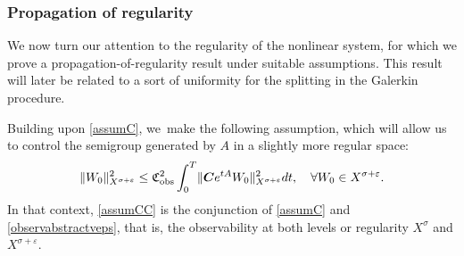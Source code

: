 \documentclass[10pt]{amsart}
\theoremstyle{definition}
\let\veps\varepsilon
\newcommand{\bC}{\boldsymbol{C}}
\providecommand{\norm}[1]{\lVert#1\rVert}
\begin{document}
\subsubsection{Propagation of regularity} We now turn our attention to the regularity of the nonlinear system, for which we prove a propagation-of-regularity result under suitable assumptions. This result will later be related to a sort of uniformity for the splitting in the Galerkin procedure.

Building upon \cref{assumC}, we~make the following assumption, which will allow us to control the semigroup generated by $A$ in a slightly more regular space:
\begin{align}\label{observabstractveps}
\norm{W_0}_{X^{\sigma+\veps}}^2\leq \mathfrak{C}_{\textup{obs}}^2\int_0^T \norm{\bC e^{tA}W_0}_{X^{\sigma+\veps}}^2dt,\quad \forall W_0\in X^{\sigma+\veps}.
\end{align}
In that context, \cref{assumCC} is the conjunction of \cref{assumC} and \eqref{observabstractveps}, that is, the observability at both levels or regularity $X^{\sigma}$ and $X^{\sigma+\veps}$.
\end{document}
